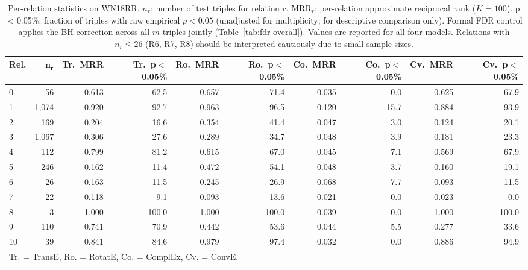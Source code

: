 \begin{table}[t]
\centering
\caption{Per-relation statistics on WN18RR. $n_r$: number of test triples for relation $r$. MRR$_r$: per-relation approximate reciprocal rank ($K=100$). p$<$0.05\%: fraction of triples with raw empirical $p < 0.05$ (unadjusted for multiplicity; for descriptive comparison only). Formal FDR control applies the BH correction across all $m$ triples jointly (Table~\ref{tab:fdr-overall}). Values are reported for all four models. Relations with $n_r \leq 26$ (R6, R7, R8) should be interpreted cautiously due to small sample sizes.}
\label{tab:per-relation}
\small
\begin{tabular}{lrrrrrrrrr}
\toprule
\textbf{Rel.} & $\boldsymbol{n_r}$ & \textbf{Tr.\ MRR} & \textbf{Tr.\ p$<$0.05\%} & \textbf{Ro.\ MRR} & \textbf{Ro.\ p$<$0.05\%} & \textbf{Co.\ MRR} & \textbf{Co.\ p$<$0.05\%} & \textbf{Cv.\ MRR} & \textbf{Cv.\ p$<$0.05\%} \\
\midrule
0 & 56 & 0.613 & 62.5 & 0.657 & 71.4 & 0.035 & 0.0 & 0.625 & 67.9 \\
1 & 1,074 & 0.920 & 92.7 & 0.963 & 96.5 & 0.120 & 15.7 & 0.884 & 93.9 \\
2 & 169 & 0.204 & 16.6 & 0.354 & 41.4 & 0.047 & 3.0 & 0.124 & 20.1 \\
3 & 1,067 & 0.306 & 27.6 & 0.289 & 34.7 & 0.048 & 3.9 & 0.181 & 23.3 \\
4 & 112 & 0.799 & 81.2 & 0.615 & 67.0 & 0.045 & 7.1 & 0.569 & 67.9 \\
5 & 246 & 0.162 & 11.4 & 0.472 & 54.1 & 0.048 & 3.7 & 0.160 & 19.1 \\
6 & 26 & 0.163 & 11.5 & 0.245 & 26.9 & 0.068 & 7.7 & 0.093 & 11.5 \\
7 & 22 & 0.118 & 9.1 & 0.093 & 13.6 & 0.021 & 0.0 & 0.023 & 0.0 \\
8 & 3 & 1.000 & 100.0 & 1.000 & 100.0 & 0.039 & 0.0 & 1.000 & 100.0 \\
9 & 110 & 0.741 & 70.9 & 0.442 & 53.6 & 0.044 & 5.5 & 0.277 & 33.6 \\
10 & 39 & 0.841 & 84.6 & 0.979 & 97.4 & 0.032 & 0.0 & 0.886 & 94.9 \\
\bottomrule
\multicolumn{10}{l}{\footnotesize Tr. = TransE, Ro. = RotatE, Co. = ComplEx, Cv. = ConvE.} \\
\end{tabular}
\end{table}

